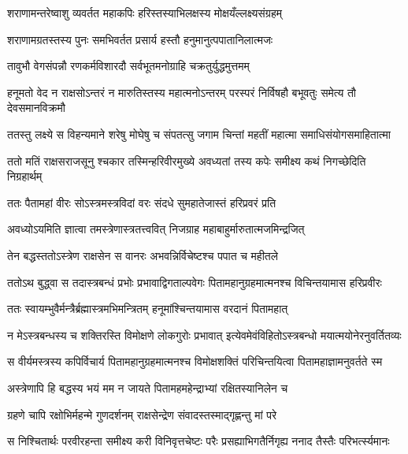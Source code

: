 \twolineshloka
{शराणामन्तरेष्वाशु व्यवर्तत महाकपिः}
{हरिस्तस्याभिलक्षस्य मोक्षयँल्लक्ष्यसंग्रहम्} %

\twolineshloka
{शराणामग्रतस्तस्य पुनः समभिवर्तत}
{प्रसार्य हस्तौ हनुमानुत्पपातानिलात्मजः} %

\twolineshloka
{तावुभौ वेगसंपन्नौ रणकर्मविशारदौ}
{सर्वभूतमनोग्राहि चक्रतुर्युद्धमुत्तमम्} %

\fourlineindentedshloka
{हनूमतो वेद न राक्षसोऽन्तरं}
{ न मारुतिस्तस्य महात्मनोऽन्तरम्}
{परस्परं निर्विषहौ बभूवतुः}
{ समेत्य तौ देवसमानविक्रमौ} %

\fourlineindentedshloka
{ततस्तु लक्ष्ये स विहन्यमाने}
{ शरेषु मोघेषु च संपतत्सु}
{जगाम चिन्तां महतीं महात्मा}
{ समाधिसंयोगसमाहितात्मा} %

\fourlineindentedshloka
{ततो मतिं राक्षसराजसूनु}
{श्चकार तस्मिन्हरिवीरमुख्ये}
{अवध्यतां तस्य कपेः समीक्ष्य}
{ कथं निगच्छेदिति निग्रहार्थम्} %

\twolineshloka
{ततः पैतामहां वीरः सोऽस्त्रमस्त्रविदां वरः}
{संदधे सुमहातेजास्तं हरिप्रवरं प्रति} %

\twolineshloka
{अवध्योऽयमिति ज्ञात्वा तमस्त्रेणास्त्रतत्त्ववित्}
{निजग्राह महाबाहुर्मारुतात्मजमिन्द्रजित्} %

\twolineshloka
{तेन बद्धस्ततोऽस्त्रेण राक्षसेन स वानरः}
{अभवन्निर्विचेष्टश्च पपात च महीतले} %

\fourlineindentedshloka
{ततोऽथ बुद्ध्वा स तदास्त्रबन्धं}
{ प्रभोः प्रभावाद्विगताल्पवेगः}
{पितामहानुग्रहमात्मनश्च}
{ विचिन्तयामास हरिप्रवीरः} %

\twolineshloka
{ततः स्वायम्भुवैर्मन्त्रैर्ब्रह्मास्त्रमभिमन्त्रितम्}
{हनूमांश्चिन्तयामास वरदानं पितामहात्} %

\fourlineindentedshloka
{न मेऽस्त्रबन्धस्य च शक्तिरस्ति}
{ विमोक्षणे लोकगुरोः प्रभावात्}
{इत्येवमेवंविहितोऽस्त्रबन्धो}
{ मयात्मयोनेरनुवर्तितव्यः} %

\fourlineindentedshloka
{स वीर्यमस्त्रस्य कपिर्विचार्य}
{ पितामहानुग्रहमात्मनश्च}
{विमोक्षशक्तिं परिचिन्तयित्वा}
{ पितामहाज्ञामनुवर्तते स्म} %

\twolineshloka
{अस्त्रेणापि हि बद्धस्य भयं मम न जायते}
{पितामहमहेन्द्राभ्यां रक्षितस्यानिलेन च} %

\twolineshloka
{ग्रहणे चापि रक्षोभिर्महन्मे गुणदर्शनम्}
{राक्षसेन्द्रेण संवादस्तस्माद्गृह्णन्तु मां परे} %

\fourlineindentedshloka
{स निश्चितार्थः परवीरहन्ता}
{ समीक्ष्य करी विनिवृत्तचेष्टः}
{परैः प्रसह्याभिगतैर्निगृह्य}
{ ननाद तैस्तैः परिभर्त्स्यमानः} %

